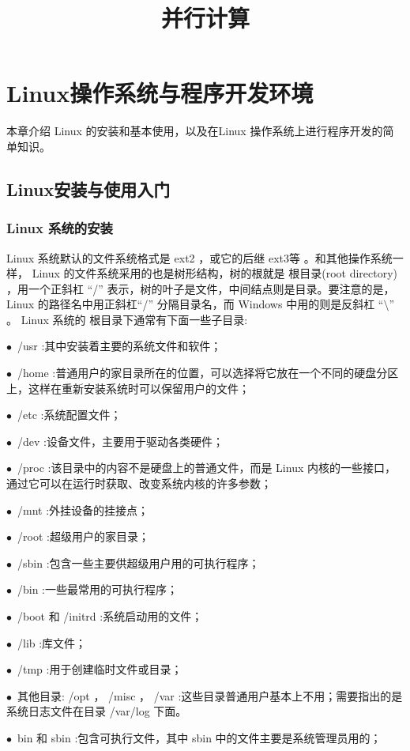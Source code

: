 \documentclass[12pt，a4paper]{article}
\title{并行计算}
\author{}
\date{\chntoday}
\numberwithin{equation}{section}
\begin{document}
\maketitle

\section{Linux操作系统与程序开发环境}
本章介绍 Linux 的安装和基本使用，以及在Linux 操作系统上进行程序开发的简单知识。
\subsection{Linux安装与使用入门}
\subsubsection{Linux 系统的安装}
Linux 系统默认的文件系统格式是 ext2 ，或它的后继 ext3等 。和其他操作系统一样， Linux 的文件系统采用的也是树形结构，树的根就是 根目录(root directory) ，用一个正斜杠 “/” 表示，树的叶子是文件，中间结点则是目录。要注意的是， Linux 的路径名中用正斜杠“/” 分隔目录名，而 Windows 中用的则是反斜杠 “$\setminus$” 。 Linux 系统的
根目录下通常有下面一些子目录:

$\bullet$~/usr :其中安装着主要的系统文件和软件；

$\bullet$~/home :普通用户的家目录所在的位置，可以选择将它放在一个不同的硬盘分区上，这样在重新安装系统时可以保留用户的文件；

$\bullet$~/etc :系统配置文件；

$\bullet$~/dev :设备文件，主要用于驱动各类硬件；

$\bullet$~/proc :该目录中的内容不是硬盘上的普通文件，而是 Linux 内核的一些接口，通过它可以在运行时获取、改变系统内核的许多参数；

$\bullet$~/mnt :外挂设备的挂接点；

$\bullet$~/root :超级用户的家目录；

$\bullet$~/sbin :包含一些主要供超级用户用的可执行程序；

$\bullet$~/bin :一些最常用的可执行程序；

$\bullet$~/boot 和 /initrd :系统启动用的文件；

$\bullet$~/lib :库文件；

$\bullet$~/tmp :用于创建临时文件或目录；

$\bullet$~其他目录: /opt ， /misc ， /var :这些目录普通用户基本上不用；需要指出的是系统日志文件在目录 /var/log 下面。

$\bullet$~bin 和 sbin :包含可执行文件，其中 sbin 中的文件主要是系统管理员用的；
\end{document}
